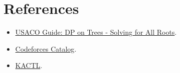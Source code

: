 \section*{References}

\begin{itemize}
  \item \href{https://usaco.guide/gold/all-roots?lang=cpp}{USACO Guide: DP on Trees - Solving for All Roots}.
  \item \href{https://codeforces.com/catalog}{Codeforces Catalog}.
  \item \href{https://github.com/kth-competitive-programming/kactl}{KACTL}.
\end{itemize}
